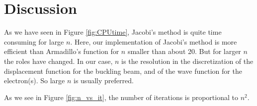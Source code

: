 \section{Discussion}
\label{sec:discussion}

As we have seen in Figure \ref{fig:CPUtime}, Jacobi's method is quite time consuming for large $n$. Here, our implementation of Jacobi's method is more efficient than Armadillo's function for $n$ smaller than about 20. But for larger $n$ the roles have changed. In our case, $n$ is the resolution in the discretization of the displacement function for the buckling beam, and of the wave function for the electron(s). So large $n$ is usually preferred. 

As we see in Figure \ref{fig:n_vs_it}, the number of iterations is proportional to $n^2$. 